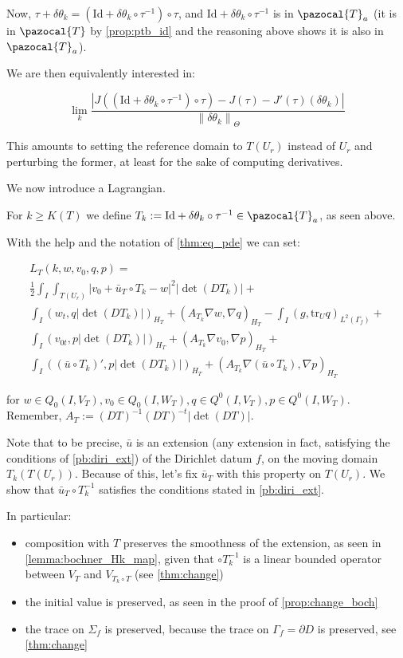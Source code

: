 \documentclass[english,a4paper,12pt,oneside]{scrbook}
\theoremstyle{break}
\theoremstyle{remark}
\newcommand{\norm}[1]{\left\lVert#1\right\rVert}
\newcommand{\tr}{\text{tr}}
\newcommand{\cT}{\pazocal{T}}
\newcommand{\id}{\text{Id}}
\newcommand{\te}{\theta}
\newcommand{\Te}{\Theta}
\begin{document}
Now, $\tau+\delta \te_k  = (\id+\delta\te_k \circ \tau^{-1})\circ \tau$, and $\id+\delta\te_k \circ \tau^{-1}$ is in $\cT_a$ (it is in $\cT$ by \cref{prop:ptb_id} and the reasoning above shows it is also in $\cT_a$).

We are then equivalently interested in:

$$\lim_{k}\frac{|J((\id+\delta\te_k \circ \tau^{-1})\circ \tau)-J(\tau)-J'(\tau)(\delta \te_k)|}{\norm{\delta \te_k}_{\Te}}$$

This amounts to setting the reference domain to $T(U_r)$ instead of $U_r$ and perturbing the former, at least for the sake of computing derivatives.

We now introduce a Lagrangian.

For $k\geq K(T)$ we define $T_k:=\id+\delta\te_k \circ \tau^{-1} \in \cT_a$, as seen above.

With the help and the notation of \cref{thm:eq_pde} we can set:

\begin{align*}
L_T(k,w,v_0,q,p) = \\
\frac{1}{2}\int_I \int_{T(U_r)}|v_0+\bar{u}_T\circ T_k - w|^2|\det(DT_k)|+\\
\int_I ( w_t , q |\det(DT_k)|)_{H_T}+ (A_{T_k}\nabla w, \nabla q)_{H_T} -\int_I(g,\tr_{U} q)_{L^2(\Gamma_f)} +\\ \int_I (v_{0t},p |\det(DT_k)|)_{H_T} + (A_{T_k} \nabla v_0, \nabla p)_{H_T}+\\\int_I((\bar{u}\circ T_k)',p|\det(DT_k)|)_{H_T}+(A_{T_k} \nabla (\bar{u} \circ T_k), \nabla p)_{H_T}
\end{align*}

for $w \in Q_0(I, V_T), v_0 \in Q_0(I,W_T), q \in Q^0(I, V_T), p \in Q^0(I, W_T)$. Remember,  $A_T:=  (DT)^{-1}(DT)^{-t}|\det(DT)|$.

Note that to be precise, $\bar{u}$ is an extension (any extension in fact, satisfying the conditions of \cref{pb:diri_ext}) of the Dirichlet datum $f$, on the moving domain $T_k(T(U_r))$. Because of this, let's fix $\bar{u}_T$ with this property on $T(U_r)$. We show that $\bar{u}_T\circ T_k^{-1}$ satisfies the conditions stated in \cref{pb:diri_ext}. 

In particular:

\begin{itemize}
	\item composition with $T$ preserves the smoothness of the extension, as seen in \cref{lemma:bochner_Hk_map}, given that $\circ T_k^{-1}$ is a linear bounded operator between $V_T$ and $V_{T_k \circ T}$ (see \ref{thm:change})
	\item the initial value is preserved, as seen in the proof of \cref{prop:change_boch}
	\item the trace on $\Sigma_f$ is preserved, because the trace on $\Gamma_f=\partial D$ is preserved, see \cref{thm:change}
\end{itemize}
\end{document}
